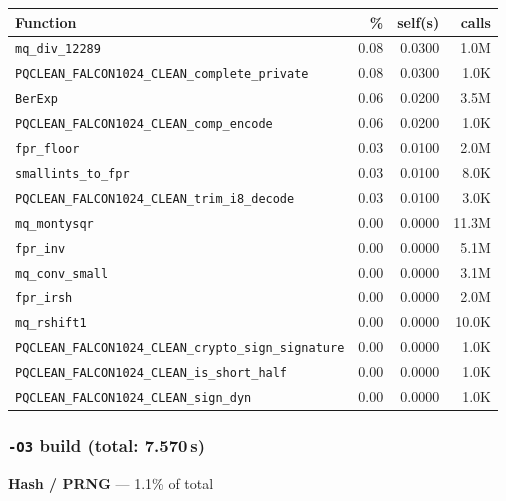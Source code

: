 \documentclass[11pt,a4paper]{article}
\begin{document}
\begin{longtable}{p{7.5cm}rrr}
\toprule
Function & \% & self(s) & calls \\
\midrule
\endhead
  \texttt{mq\_div\_12289} & 0.08 & 0.0300 & 1.0M \\
  \texttt{PQCLEAN\_FALCON1024\_CLEAN\_complete\_private} & 0.08 & 0.0300 & 1.0K \\
  \texttt{BerExp} & 0.06 & 0.0200 & 3.5M \\
  \texttt{PQCLEAN\_FALCON1024\_CLEAN\_comp\_encode} & 0.06 & 0.0200 & 1.0K \\
  \texttt{fpr\_floor} & 0.03 & 0.0100 & 2.0M \\
  \texttt{smallints\_to\_fpr} & 0.03 & 0.0100 & 8.0K \\
  \texttt{PQCLEAN\_FALCON1024\_CLEAN\_trim\_i8\_decode} & 0.03 & 0.0100 & 3.0K \\
  \texttt{mq\_montysqr} & 0.00 & 0.0000 & 11.3M \\
  \texttt{fpr\_inv} & 0.00 & 0.0000 & 5.1M \\
  \texttt{mq\_conv\_small} & 0.00 & 0.0000 & 3.1M \\
  \texttt{fpr\_irsh} & 0.00 & 0.0000 & 2.0M \\
  \texttt{mq\_rshift1} & 0.00 & 0.0000 & 10.0K \\
  \texttt{PQCLEAN\_FALCON1024\_CLEAN\_crypto\_sign\_signature} & 0.00 & 0.0000 & 1.0K \\
  \texttt{PQCLEAN\_FALCON1024\_CLEAN\_is\_short\_half} & 0.00 & 0.0000 & 1.0K \\
  \texttt{PQCLEAN\_FALCON1024\_CLEAN\_sign\_dyn} & 0.00 & 0.0000 & 1.0K \\
\bottomrule
\end{longtable}

\subsubsection*{\texttt{-O3} build (total: 7.570\,s)}

\noindent\colorbox{hashcolor}{\strut \textbf{Hash / PRNG} --- 1.1\% of total}
\vspace{2pt}
\end{document}
